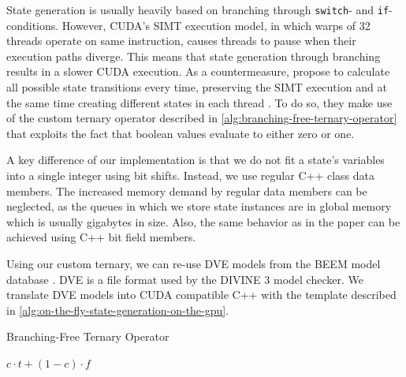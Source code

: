 \documentclass[
fancyheadings, %
%
%
]{stsreprt}
\DeclareMathOperator{\branchFreeTernary}{\texttt{BranchFreeTernary}}
\begin{document}
State generation is usually heavily based on branching through \texttt{switch}- and \texttt{if}-conditions.
However, CUDA's SIMT execution model, in which warps of 32 threads operate on same instruction, causes threads to pause when their execution paths diverge.
This means that state generation through branching results in a slower CUDA execution.
As a countermeasure, \citeauthor*{Bartocci2014.GPGPU-Parallel-SPIN} propose to calculate all possible state transitions every time, preserving the SIMT execution and at the same time creating different states in each thread \cite[Algorithm 3]{Bartocci2014.GPGPU-Parallel-SPIN}.
To do so, they make use of the custom ternary operator described in \cref{alg:branching-free-ternary-operator} that exploits the fact that boolean values evaluate to either zero or one.

A key difference of our implementation is that we do not fit a state's variables into a single integer using bit shifts.
Instead, we use regular C++ class data members.
The increased memory demand by regular data members can be neglected, as the queues in which we store state instances are in global memory which is usually gigabytes in size.
Also, the same behavior as in the paper can be achieved using C++ bit field members.

Using our custom ternary, we can re-use DVE models from the BEEM model database \cite{BEEM-Database}.
DVE is a file format used by the DIVINE 3 model checker.
We translate DVE models into CUDA compatible C++ with the template described in \cref{alg:on-the-fly-state-generation-on-the-gpu}.


\begin{algorithm}
    \caption{Branching-Free Ternary Operator}
    \label{alg:branching-free-ternary-operator}
    \begin{algorithmic}
        \Function{$\branchFreeTernary$}{bool c, int t, int f}
        \State \Return $c \cdot t + (1 - c) \cdot f$
        \EndFunction
    \end{algorithmic}
\end{algorithm}
\end{document}
